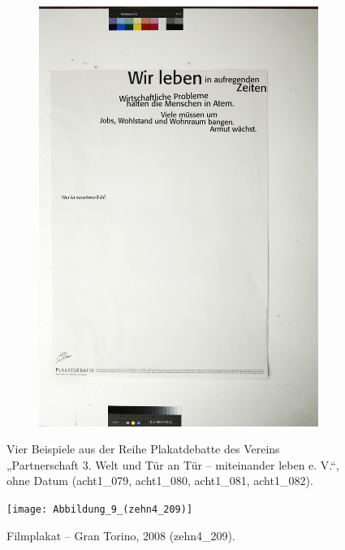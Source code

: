 \documentclass[a4paper,12pt,ngerman]{article}
\begin{document}
\begin{figure}[ht]
\begin{subfigure}[b]{0.5\linewidth}
	\includegraphics[width=\linewidth]{Abbildung_8d_(acht1_082)}
	\end{subfigure}	
\caption{Vier Beispiele aus der Reihe Plakatdebatte des Vereins „Partnerschaft 3. Welt und Tür an Tür -- miteinander leben e. V.“, ohne Datum (acht1\_079, acht1\_080, acht1\_081, acht1\_082).}
\end{figure}

\newpage
\begin{figure}[ht]
\texttt{[image: Abbildung\_9\_(zehn4\_209)]}
\centering
\caption{Filmplakat -- Gran Torino, 2008 (zehn4\_209).}
\end{figure}
\end{document}
